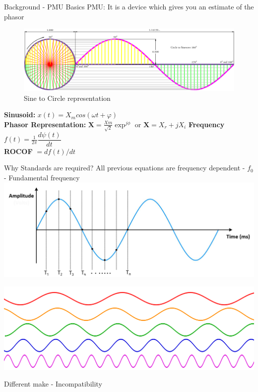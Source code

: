 \documentclass{beamer}
\begin{document}
   \begin{frame}{Background - PMU Basics}
   PMU: It is a device which gives you an estimate of the phasor 
   \begin{figure}
   \includegraphics*[scale = 0.2]{Circle-To-Sine-Wave.png}
   \caption{Sine to Circle representation \cite{site:westau}}
   \end{figure}

   \textbf{Sinusoid:} \textbf{$x(t) = X_m cos(\omega t + \varphi)$} \\
	\textbf{Phasor Representation:} $\textbf{X} = \frac{Xm}{\sqrt{2}}\exp^{j\phi} $ or $\textbf{X} = X_r+jX_i$
	\textbf{Frequency} $f(t) = \frac{1}{2\pi} \dfrac{d\psi(t)}{dt}$\\
	\textbf{ROCOF} $= df(t)/dt$
   
   \end{frame}

\begin{frame}{Why Standards are required?}
\centering
All previous equations are frequency dependent - $f_0$ - Fundamental frequency
\includegraphics[scale=0.2]{sine_sampled.png} \\
\pause

\includegraphics[scale=0.1]{multisine.png}

\pause

\hspace{50pt}Different make - Incompatibility 
\end{frame}
   
\end{document}
